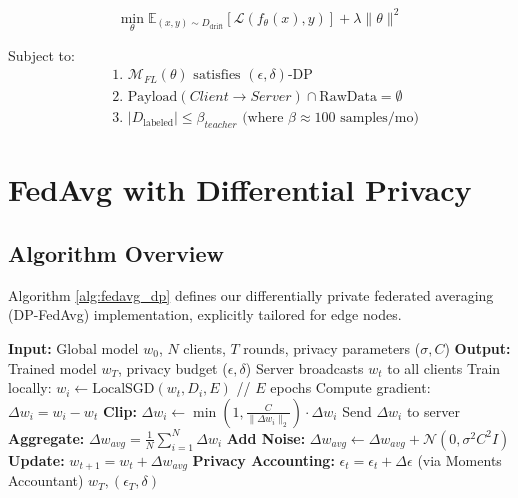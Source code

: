 \documentclass[conference]{IEEEtran}
\begin{document}
\begin{equation}
\min_{\theta} \mathbb{E}_{(x,y) \sim D_{\text{drift}}} \left[ \mathcal{L}(f_\theta(x), y) \right] + \lambda \|\theta\|^2
\end{equation}

Subject to:
\begin{align*}
    &\text{1. } \mathcal{M}_{FL}(\theta) \text{ satisfies } (\epsilon, \delta)\text{-DP} \\
    &\text{2. } \text{Payload}(Client \to Server) \cap \text{RawData} = \emptyset \\
    &\text{3. } |D_{\text{labeled}}| \leq \beta_{teacher} \text{ (where } \beta \approx 100 \text{ samples/mo)}
\end{align*}

\section{FedAvg with Differential Privacy}

\subsection{Algorithm Overview}

Algorithm \ref{alg:fedavg_dp} defines our differentially private federated averaging (DP-FedAvg) implementation, explicitly tailored for edge nodes.

\begin{algorithm}[h]
\caption{FedAvg with Differential Privacy}
\label{alg:fedavg_dp}
\begin{algorithmic}[1]
\STATE \textbf{Input:} Global model $w_0$, $N$ clients, $T$ rounds, privacy parameters ($\sigma, C$)
\STATE \textbf{Output:} Trained model $w_T$, privacy budget ($\epsilon, \delta$)
    \STATE Server broadcasts $w_t$ to all clients
        \STATE Train locally: $w_i \leftarrow \text{LocalSGD}(w_t, D_i, E)$ // $E$ epochs
        \STATE Compute gradient: $\Delta w_i = w_i - w_t$
        \STATE \textbf{Clip:} $\Delta w_i \leftarrow \min(1, \frac{C}{\|\Delta w_i\|_2}) \cdot \Delta w_i$
        \STATE Send $\Delta w_i$ to server
    \ENDFOR
    \STATE \textbf{Aggregate:} $\Delta w_{avg} = \frac{1}{N}\sum_{i=1}^{N} \Delta w_i$
    \STATE \textbf{Add Noise:} $\Delta w_{avg} \leftarrow \Delta w_{avg} + \mathcal{N}(0, \sigma^2 C^2 I)$
    \STATE \textbf{Update:} $w_{t+1} = w_t + \Delta w_{avg}$
    \STATE \textbf{Privacy Accounting:} $\epsilon_t = \epsilon_t + \Delta \epsilon$ (via Moments Accountant)
\ENDFOR
\RETURN $w_T, (\epsilon_T, \delta)$
\end{algorithmic}
\end{algorithm}
\end{document}
